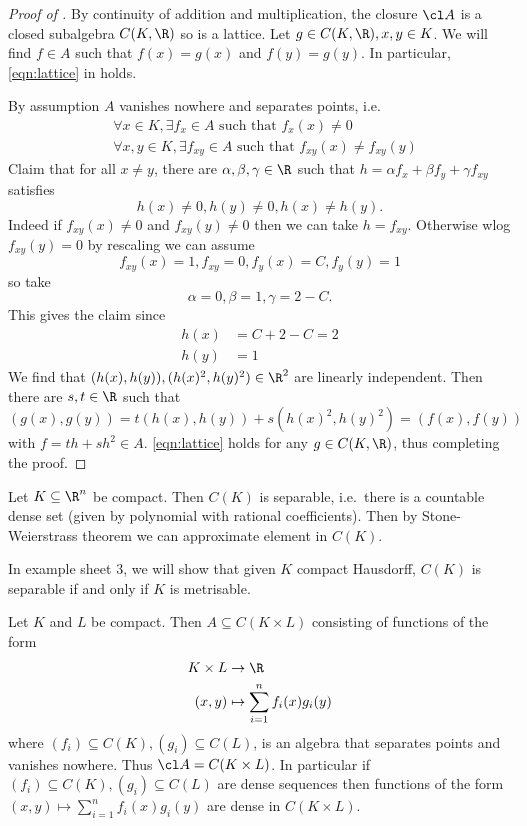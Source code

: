 \documentclass[a4paper]{article}
\begin{document}
\begin{proof}[Proof of ]
  By continuity of addition and multiplication, the closure \(\cl A\) is a closed subalgebra \(C(K, \R)\) so is a lattice. Let \(g \in C(K, \R), x, y \in K\). We will find \(f \in A\) such that \(f(x) = g(x)\) and \(f(y) = g(y)\). In particular, \eqref{eqn:lattice} in  holds.

  By assumption \(A\) vanishes nowhere and separates points, i.e.\
  \begin{align*}
    & \forall x \in K, \exists f_x \in A \text{ such that } f_x(x) \neq 0 \\
    & \forall x, y \in K, \exists f_{xy} \in A \text{ such that } f_{xy}(x) \neq f_{xy}(y)
  \end{align*}
  Claim that for all \(x \neq y\), there are \(\alpha, \beta, \gamma \in \R\) such that \(h = \alpha f_x + \beta f_y + \gamma f_{xy}\) satisfies
  \[
    h(x) \neq 0, h(y) \neq 0, h(x) \neq h(y).
  \]
  Indeed if \(f_{xy}(x) \neq 0\) and \(f_{xy}(y) \neq 0\) then we can take \(h = f_{xy}\). Otherwise wlog \(f_{xy}(y) = 0\) by rescaling we can assume
  \[
    f_{xy}(x) = 1, f_{xy} = 0, f_y(x) = C, f_y(y) = 1
  \]
  so take
  \[
    \alpha = 0, \beta = 1, \gamma = 2 - C.
  \]
  This gives the claim since
  \begin{align*}
    h(x) &= C + 2 - C = 2 \\
    h(y) &= 1
  \end{align*}
  We find that \((h(x), h(y)), (h(x)^2, h(y)^2) \in \R^2\) are linearly independent. Then there are \(s, t \in \R\) such that
  \[
    (g(x), g(y)) = t (h(x), h(y)) + s (h(x)^2, h(y)^2) = (f(x), f(y))
  \]
  with \(f = th + sh^2 \in A\). \eqref{eqn:lattice} holds for any \(g \in C(K, \R)\), thus completing the proof.
\end{proof}

\begin{eg}
  Let \(K \subseteq \R^n\) be compact. Then \(C(K)\) is separable, i.e.\ there is a countable dense set (given by polynomial with rational coefficients). Then by Stone-Weierstrass theorem we can approximate element in \(C(K)\).

  In example sheet 3, we will show that given \(K\) compact Hausdorff, \(C(K)\) is separable if and only if \(K\) is metrisable.
\end{eg}

\begin{ex}
  Let \(K\) and \(L\) be compact. Then \(A \subseteq C(K \times L)\) consisting of functions of the form
  \begin{align*}
    K \times L &\to \R \\
    (x, y) &\mapsto \sum_{i = 1}^n f_i(x) g_i(y)
  \end{align*}
  where \((f_i) \subseteq C(K), (g_i) \subseteq C(L)\), is an algebra that separates points and vanishes nowhere. Thus \(\cl A = C(K \times L)\). In particular if \((f_i) \subseteq C(K), (g_i) \subseteq C(L)\) are dense sequences then functions of the form \((x, y) \mapsto \sum_{i = 1}^n f_i(x)g_i(y)\) are dense in \(C(K \times L)\).
\end{ex}
\end{document}
